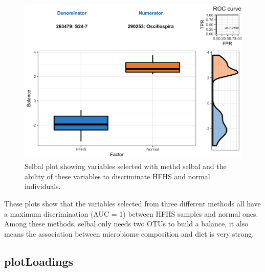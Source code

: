 \documentclass[openany]{book}
\newenvironment{Shaded}{\begin{snugshade}}{\end{snugshade}}
\newcommand{\KeywordTok}[1]{\textcolor[rgb]{0.13,0.29,0.53}{\textbf{#1}}}
\newcommand{\DataTypeTok}[1]{\textcolor[rgb]{0.13,0.29,0.53}{#1}}
\newcommand{\StringTok}[1]{\textcolor[rgb]{0.31,0.60,0.02}{#1}}
\newcommand{\CommentTok}[1]{\textcolor[rgb]{0.56,0.35,0.01}{\textit{#1}}}
\newcommand{\OperatorTok}[1]{\textcolor[rgb]{0.81,0.36,0.00}{\textbf{#1}}}
\newcommand{\NormalTok}[1]{#1}
\begin{document}
\begin{figure}

{\centering \includegraphics[width=1\linewidth]{./Generated_plots/unnamed-chunk-26-1} 

}

\caption{Selbal plot showing variables selected with methd selbal and the ability of these variables to discriminate HFHS and normal individuals.}\label{fig:unnamed-chunk-26}
\end{figure}

These plots show that the variables selected from three different
methods all have a maximum discrimination (AUC = 1) between HFHS samples
and normal ones. Among these methods, selbal only needs two OTUs to
build a balance, it also means the association between microbiome
composition and diet is very strong.

\subsection{plotLoadings}\label{plotloadings-1}

\begin{Shaded}
\end{Shaded}
\end{document}
